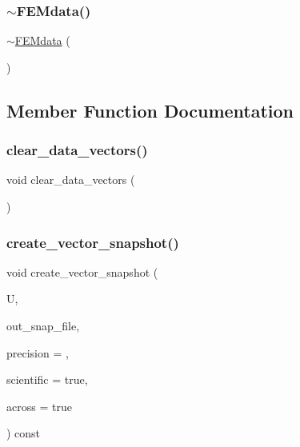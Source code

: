 \mbox{\label{class_f_e_mdata_ab7baf283d0dd33996919e2530b735d84}} 
\subsubsection{\texorpdfstring{$\sim$\+F\+E\+Mdata()}{~FEMdata()}}
{\footnotesize\ttfamily $\sim$\mbox{\hyperlink{class_f_e_mdata}{F\+E\+Mdata}} (\begin{DoxyParamCaption}{ }\end{DoxyParamCaption})}



\subsection{Member Function Documentation}
\mbox{\label{class_f_e_mdata_ac201e22d75178ffe4d4355c53ee0b756}} 
\subsubsection{\texorpdfstring{clear\+\_\+data\+\_\+vectors()}{clear\_data\_vectors()}}
{\footnotesize\ttfamily void clear\+\_\+data\+\_\+vectors (\begin{DoxyParamCaption}{ }\end{DoxyParamCaption})}

\mbox{\label{class_f_e_mdata_aaffa90fc1adcd37311428f7e49b98263}} 
\subsubsection{\texorpdfstring{create\+\_\+vector\+\_\+snapshot()}{create\_vector\_snapshot()}}
{\footnotesize\ttfamily void create\+\_\+vector\+\_\+snapshot (\begin{DoxyParamCaption}\item[{vector\+Type \&}]{U,  }\item[{std\+::string}]{out\+\_\+snap\+\_\+file,  }\item[{unsigned int}]{precision = {},  }\item[{const bool}]{scientific = {\ttfamily true},  }\item[{const bool}]{across = {\ttfamily true} }\end{DoxyParamCaption}) const}

